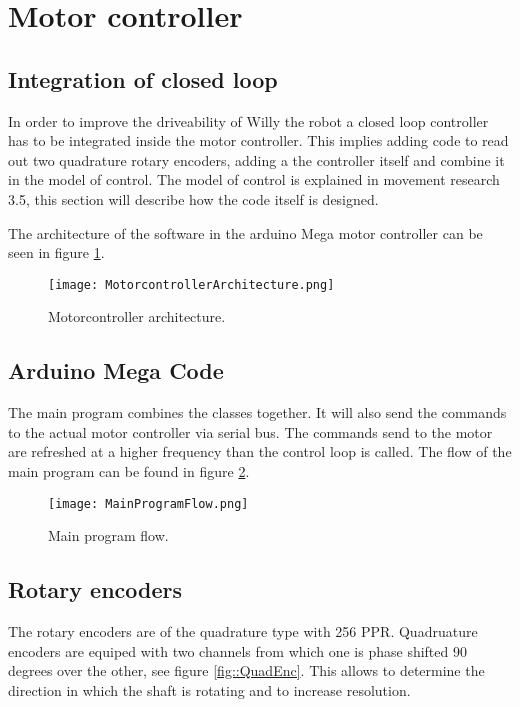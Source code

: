 \section{Motor controller}

\subsection{Integration of closed loop}
In order to improve the driveability of Willy the robot a closed loop controller has to be integrated inside the motor controller. 
This implies adding code to read out two quadrature rotary encoders, adding a the controller itself and combine it in the model of control.
The model of control is explained in movement research 3.5, this section will describe how the code itself is designed.

The architecture of the software in the arduino Mega motor controller can be seen in figure \ref{fig::Motorconarc}.

\begin{figure}[H]
\centering
\texttt{[image: MotorcontrollerArchitecture.png]}
\caption{Motorcontroller architecture.}
\label{fig::Motorconarc}
\end{figure}

\subsection{Arduino Mega Code}
The main program combines the classes together. It will also send the commands to the actual motor controller via serial bus. The commands send to the motor are refreshed at a higher frequency than the control loop is called. The flow of the main program can be found in figure \ref{fig::MPF}.

\begin{figure}[H]
\centering
\texttt{[image: MainProgramFlow.png]}
\caption{Main program flow.}
\label{fig::MPF}
\end{figure}


\subsection{Rotary encoders}
The rotary encoders are of the quadrature type with 256 PPR. 
Quadruature encoders are equiped with two channels from which one is phase shifted 90 degrees over the other, see figure \ref{fig::QuadEnc}.
This allows to determine the direction in which the shaft is rotating and to increase resolution.

